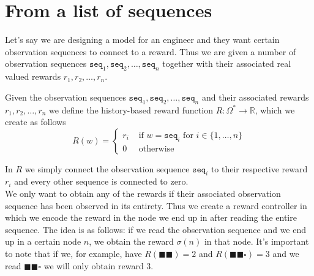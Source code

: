 \section{From a list of sequences}
\label{sec:rc-sequences}
Let's say we are designing a model for an engineer and they want certain observation sequences to connect to a reward. Thus we are given a number of observation sequences $\texttt{seq}_1,\texttt{seq}_2,\dots,\texttt{seq}_n$ together with their associated real valued rewards $r_1,r_2,\dots,r_n$.
\begin{definition}
Given the observation sequences $\texttt{seq}_1,\texttt{seq}_2,\dots,\texttt{seq}_n$ and their associated rewards $r_1,r_2,\dots,r_n$ we define the history-based reward function $R:\Omega^*\to\mathbb{R}$, which we create as follows
\[R(w) = \begin{cases}
	r_i &\text{ if } w=\texttt{seq}_i \text { for } i\in \{1,\dots,n\} \\
	0   &\text{ otherwise}
	\end{cases}\]
	\label{d:created_reward_function}
\end{definition}
In $R$ we simply connect the observation sequence $\texttt{seq}_i$ to their respective reward $r_i$ and every other sequence is connected to zero.\\

We only want to obtain any of the rewards if their associated observation sequence has been observed in its entirety. Thus we create a reward controller in which we encode the reward in the node we end up in after reading the entire sequence. The idea is as follows: if we read the observation sequence and we end up in a certain node $n$, we obtain the reward $\sigma(n)$ in that node. It's important to note that if we, for example, have $R(\blacksquare\blacksquare)=2$ and $R(\blacksquare\blacksquare\square)=3$ and we read $\blacksquare\blacksquare\square$ we will only obtain reward $3$. 

